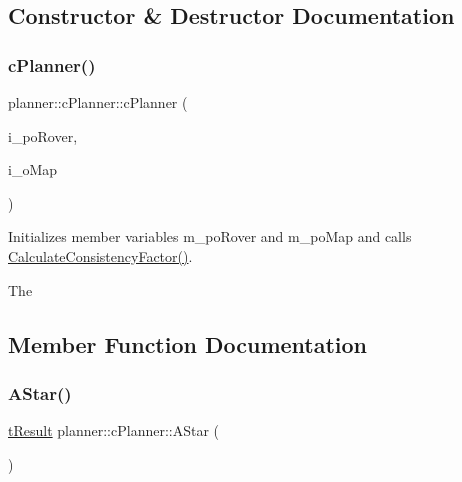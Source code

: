 \subsection{Constructor \& Destructor Documentation}
\mbox{\label{classplanner_1_1c_planner_a381d86c14532f65cf21cb80b4c64ce0e}} 
\subsubsection{\texorpdfstring{c\+Planner()}{cPlanner()}}
{\footnotesize\ttfamily planner\+::c\+Planner\+::c\+Planner (\begin{DoxyParamCaption}\item[{std\+::shared\+\_\+ptr$<$ \mbox{\hyperlink{classplanner_1_1c_rover_interface}{c\+Rover\+Interface}}$<$ 8 $>$$>$}]{i\+\_\+po\+Rover,  }\item[{std\+::shared\+\_\+ptr$<$ \mbox{\hyperlink{classplanner_1_1c_graph}{c\+Graph}} $>$}]{i\+\_\+o\+Map }\end{DoxyParamCaption})}



Initializes member variables m\+\_\+po\+Rover and m\+\_\+po\+Map and calls \mbox{\hyperlink{classplanner_1_1c_planner_a2e5a745f83f903662eff914d8beddb5e}{Calculate\+Consistency\+Factor()}}. 

The 

\subsection{Member Function Documentation}
\mbox{\label{classplanner_1_1c_planner_a341e70531266f023ac9461d18979d1ef}} 
\subsubsection{\texorpdfstring{A\+Star()}{AStar()}}
{\footnotesize\ttfamily \mbox{\hyperlink{structt_result}{t\+Result}} planner\+::c\+Planner\+::\+A\+Star (\begin{DoxyParamCaption}{ }\end{DoxyParamCaption})\hspace{0.3cm}{\ttfamily [protected]}}



